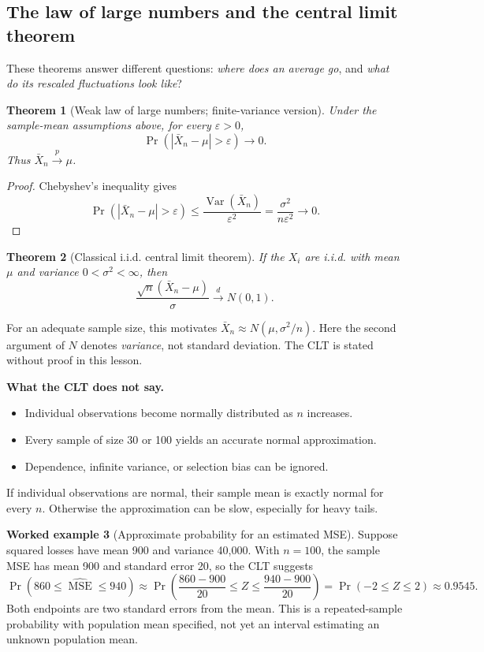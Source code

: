 \documentclass[11pt,letterpaper]{article}
\newcommand{\Var}{\operatorname{Var}}
\newcommand{\MSE}{\operatorname{MSE}}
\newtheorem{theorem}{Theorem}[section]
\theoremstyle{definition}
\newtheorem{example}[theorem]{Worked example}
\theoremstyle{remark}
\numberwithin{equation}{section}
\begin{document}
\subsection{The law of large numbers and the central limit theorem}
These theorems answer different questions: \emph{where does an average go}, and
\emph{what do its rescaled fluctuations look like}?

\begin{theorem}[Weak law of large numbers; finite-variance version]
Under the sample-mean assumptions above, for every $\varepsilon>0$,
\[
\Pr(|\bar X_n-\mu|>\varepsilon)\longrightarrow0.
\]
Thus $\bar X_n\xrightarrow{p}\mu$.
\end{theorem}
\begin{proof}
Chebyshev's inequality gives
\[
\Pr(|\bar X_n-\mu|>\varepsilon)
\leq\frac{\Var(\bar X_n)}{\varepsilon^2}
=\frac{\sigma^2}{n\varepsilon^2}\longrightarrow0.
\]
\end{proof}

\begin{theorem}[Classical i.i.d. central limit theorem]
If the $X_i$ are i.i.d. with mean $\mu$ and variance $0<\sigma^2<\infty$, then
\begin{equation}
\frac{\sqrt n(\bar X_n-\mu)}{\sigma}\xrightarrow{d}N(0,1).
\end{equation}
\end{theorem}
For an adequate sample size, this motivates
$\bar X_n\approx N(\mu,\sigma^2/n)$. Here the second argument of $N$ denotes
\emph{variance}, not standard deviation. The CLT is stated without proof in this
lesson.

\textbf{What the CLT does not say.}
\begin{itemize}
\item Individual observations become normally distributed as $n$ increases.
\item Every sample of size 30 or 100 yields an accurate normal approximation.
\item Dependence, infinite variance, or selection bias can be ignored.
\end{itemize}
If individual observations are normal, their sample mean is exactly normal for
every $n$. Otherwise the approximation can be slow, especially for heavy tails.

\begin{example}[Approximate probability for an estimated MSE]
Suppose squared losses have mean 900 and variance 40,000. With $n=100$,
the sample MSE has mean 900 and standard error 20, so the CLT suggests
\[
\Pr(860\leq\widehat{\MSE}\leq940)
\approx\Pr\!\left(\frac{860-900}{20}\leq Z\leq\frac{940-900}{20}\right)
=\Pr(-2\leq Z\leq2)\approx0.9545.
\]
Both endpoints are two standard errors from the mean. This is a repeated-sample
probability with population mean specified, not yet an interval estimating an
unknown population mean.
\end{example}
\newpage
\end{document}
